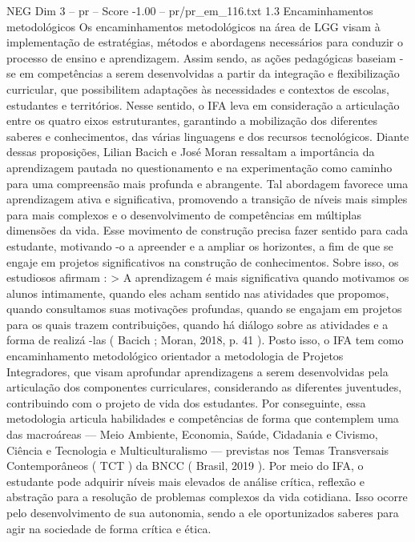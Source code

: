 \begin{textsample}{NEG Dim 3 – pr – Score -1.00 – pr/pr\_em\_116.txt}  \label{ex:f3_neg_135}
1.3 Encaminhamentos metodológicos Os encaminhamentos metodológicos na área de LGG visam à implementação de estratégias, métodos e abordagens necessários para conduzir o processo de ensino e aprendizagem.
Assim sendo, as ações pedagógicas baseiam -se em competências a serem desenvolvidas a partir da integração e flexibilização curricular, que possibilitem adaptações às necessidades e contextos de escolas, estudantes e territórios.
Nesse sentido, o IFA leva em consideração a articulação entre os quatro eixos estruturantes, garantindo a mobilização dos diferentes saberes e conhecimentos, das várias linguagens e dos recursos tecnológicos.
Diante dessas proposições, Lilian Bacich e José Moran ressaltam a importância da aprendizagem pautada no questionamento e na experimentação como caminho para uma compreensão mais profunda e abrangente.
Tal abordagem favorece uma aprendizagem ativa e significativa, promovendo a transição de níveis mais simples para mais complexos e o desenvolvimento de competências em múltiplas dimensões da vida.
Esse movimento de construção precisa fazer sentido para cada estudante, motivando -o a apreender e a ampliar os horizontes, a fim de que se engaje em projetos significativos na construção de conhecimentos.
Sobre isso, os estudiosos afirmam : > A aprendizagem é mais significativa quando motivamos os alunos intimamente, quando eles acham sentido nas atividades que propomos, quando consultamos suas motivações profundas, quando se engajam em projetos para os quais trazem contribuições, quando há diálogo sobre as atividades e a forma de realizá -las ( Bacich ; Moran, 2018, p. 41 ).
Posto isso, o IFA tem como encaminhamento metodológico orientador a metodologia de Projetos Integradores, que visam aprofundar aprendizagens a serem desenvolvidas pela articulação dos componentes curriculares, considerando as diferentes juventudes, contribuindo com o projeto de vida dos estudantes.
Por conseguinte, essa metodologia articula habilidades e competências de forma que contemplem uma das macroáreas — Meio Ambiente, Economia, Saúde, Cidadania e Civismo, Ciência e Tecnologia e Multiculturalismo — previstas nos Temas Transversais Contemporâneos ( TCT ) da BNCC ( Brasil, 2019 ).
Por meio do IFA, o estudante pode adquirir níveis mais elevados de análise crítica, reflexão e abstração para a resolução de problemas complexos da vida cotidiana.
Isso ocorre pelo desenvolvimento de sua autonomia, sendo a ele oportunizados saberes para agir na sociedade de forma crítica e ética.

\end{textsample}
